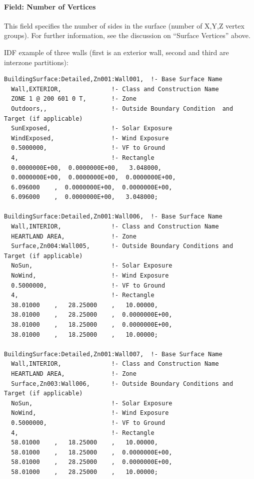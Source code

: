 \paragraph{Field: Number of Vertices}\label{field-number-of-vertices-3}

This field specifies the number of sides in the surface (number of X,Y,Z vertex groups). For further information, see the discussion on ``Surface Vertices'' above.

IDF example of three walls (first is an exterior wall, second and third are interzone partitions):

\begin{lstlisting}
BuildingSurface:Detailed,Zn001:Wall001,  !- Base Surface Name
  Wall,EXTERIOR,              !- Class and Construction Name
  ZONE 1 @ 200 601 0 T,       !- Zone
  Outdoors,,                  !- Outside Boundary Condition  and Target (if applicable)
  SunExposed,                 !- Solar Exposure
  WindExposed,                !- Wind Exposure
  0.5000000,                  !- VF to Ground
  4,                          !- Rectangle
  0.0000000E+00,  0.0000000E+00,   3.048000,
  0.0000000E+00,  0.0000000E+00,  0.0000000E+00,
  6.096000    ,  0.0000000E+00,  0.0000000E+00,
  6.096000    ,  0.0000000E+00,   3.048000;

BuildingSurface:Detailed,Zn001:Wall006,  !- Base Surface Name
  Wall,INTERIOR,              !- Class and Construction Name
  HEARTLAND AREA,             !- Zone
  Surface,Zn004:Wall005,      !- Outside Boundary Conditions and Target (if applicable)
  NoSun,                      !- Solar Exposure
  NoWind,                     !- Wind Exposure
  0.5000000,                  !- VF to Ground
  4,                          !- Rectangle
  38.01000    ,   28.25000    ,   10.00000,
  38.01000    ,   28.25000    ,  0.0000000E+00,
  38.01000    ,   18.25000    ,  0.0000000E+00,
  38.01000    ,   18.25000    ,   10.00000;

BuildingSurface:Detailed,Zn001:Wall007,  !- Base Surface Name
  Wall,INTERIOR,              !- Class and Construction Name
  HEARTLAND AREA,             !- Zone
  Surface,Zn003:Wall006,      !- Outside Boundary Conditions and Target (if applicable)
  NoSun,                      !- Solar Exposure
  NoWind,                     !- Wind Exposure
  0.5000000,                  !- VF to Ground
  4,                          !- Rectangle
  58.01000    ,   18.25000    ,   10.00000,
  58.01000    ,   18.25000    ,  0.0000000E+00,
  58.01000    ,   28.25000    ,  0.0000000E+00,
  58.01000    ,   28.25000    ,   10.00000;
\end{lstlisting}

